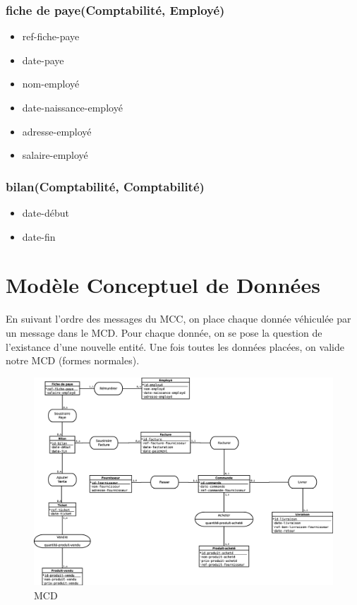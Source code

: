 \subsubsection*{fiche de paye(Comptabilité, Employé)}
\begin{itemize}
    \item ref-fiche-paye
    \item date-paye
    \item nom-employé
    \item date-naissance-employé
    \item adresse-employé
    \item salaire-employé
\end{itemize}

\subsubsection*{bilan(Comptabilité, Comptabilité)}
\begin{itemize}
    \item date-début
    \item date-fin
\end{itemize}

\section*{Modèle Conceptuel de Données}

En suivant l'ordre des messages du MCC, on place chaque donnée véhiculée par un message dans le MCD. Pour chaque donnée, on se pose la question de l'existance d'une nouvelle entité. Une fois toutes les données placées, on valide notre MCD (formes normales).

\begin{figure}[!htb]
    \begin{center}
    \includegraphics[width=15cm]{images/mcd.eps}
    \caption{\label{mcd} MCD}
    \end{center}
\end{figure}
